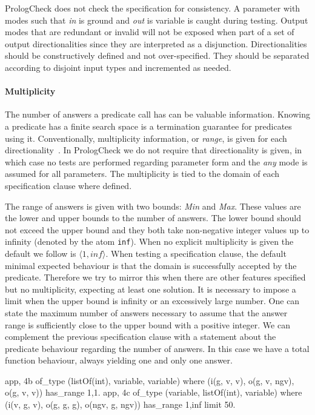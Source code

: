 \documentclass[runningheads,a4paper]{llncs}
\newcommand{\yap}[1]{\lstinline[style=yap]{#1}}
\newcommand{\plqc}[0]{{\sf PrologCheck}}
\begin{document}
\plqc{} does not check the specification for consistency. 
%
A parameter with modes such that \emph{in} is ground and \emph{out} is
variable is caught during testing.
%
Output modes that are redundant or invalid will not be exposed when part
of a set of output directionalities since they are interpreted as a
disjunction.
%
Directionalities should be constructively defined and not
over-specified.
%
They should be separated according to disjoint input types and
incremented as needed.




\paragraph{\bf Multiplicity}
The number of answers a predicate call has can be valuable
information.
%
Knowing a predicate has a finite search space is a termination
guarantee for predicates using it.
%
Conventionally, multiplicity information, or \emph{range}, is given for
each directionality~\cite{somogyi1995mercury}.
%
In \plqc{} we do not require that directionality is given, in which
case no tests are performed regarding parameter form and the \emph{any}
mode is assumed for all parameters.
%
The multiplicity is tied to the domain of each specification clause
where defined.


The range of answers is given with two bounds: \emph{Min} and
\emph{Max}.
%
These values are the lower and upper bounds to the number of answers.
%
The lower bound should not exceed the upper bound and they both take
non-negative integer values up to infinity (denoted by the atom
\yap{inf}).
%
When no explicit multiplicity is given the default we 
follow is
$\langle 1, inf \rangle $.
%
When testing a specification clause, the default minimal expected
behaviour is that the domain is successfully accepted by the predicate.
%
Therefore we try to mirror this when there are other features
specified but no multiplicity, expecting at least one solution.
%
It is necessary to impose a limit when the upper bound is infinity or an
excessively large number.
%
One can state the maximum number of answers necessary to assume that the
answer range is sufficiently close to the upper bound with a positive
integer.
%
We can complement the previous specification clause with a statement
about the predicate behaviour regarding the number of answers.
%
In this case we have a total function behaviour, always yielding one and
only one answer.
%
\begin{yapcode}
 {app, 4b} of_type (listOf(int), variable, variable)
    where (i(g, v, v), o(g, v, ngv), o(g, v, v))
    has_range {1,1}.
 {app, 4c} of_type (variable, listOf(int), variable)
    where (i(v, g, v), o(g, g, g), o(ngv, g, ngv))
    has_range {1,inf} limit 50.
\end{yapcode}
\end{document}
